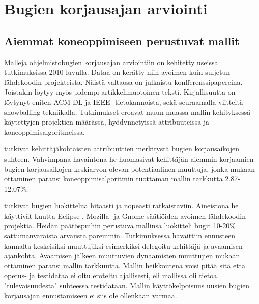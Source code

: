 \documentclass[utf8]{gradu3}
\begin{document}
\section{Bugien korjausajan arviointi}


\subsection{Aiemmat koneoppimiseen perustuvat mallit}
Malleja ohjelmistobugien korjausajan arviointiin on kehitetty useissa
tutkimuksissa 2010-luvulla. Dataa on kerätty niin avoimen kuin suljetun
lähdekoodin projekteista. Näistä valtaosa on julkaistu konfferenssipapereina.
Joistakin löytyy myös pidempi artikkelimuotoinen teksti. Kirjallisuutta on
löytynyt eniten ACM DL ja IEEE -tietokannoista, sekä seuraamalla viitteitä
snowballing-tekniikalla. Tutkimukset eroavat muun muassa mallin kehityksessä
käytettyjen projektien määrässä, hyödynnetyissä attribuuteissa ja
koneoppimisalgoritmeissa.

\textcite{Anh-2011} tutkivat kehittäjäkohtaisten attribuuttien merkitystä bugien
korjausaikojen suhteen. Vahvimpana havaintona he huomasivat kehittäjän aiemmin
korjaamien bugien korjausaikojen keskiarvon olevan potentiaalinen muuttuja,
jonka mukaan ottaminen paransi koneoppimisalgoritmin tuottaman mallin tarkkutta
2.87-12.07\%.

\textcite{Giger-2010} tutkivat bugien luokittelua hitaasti ja nopeasti
ratkaistaviin. Aineistona he käyttivät kuutta Eclipse-, Mozilla- ja
Gnome-säätiöiden avoimen lähdekoodin projektia. Heidän päätöspuihin perustuva
mallinsa luokitteli bugit 10-20\% sattumanvaraista arvausta paremmin.
Tutkimuksessa havaittiin ennusteen kannalta keskeisiksi muuttujiksi esimerkiksi
delegoitu kehittäjä ja avaamisen ajankohta. Avaamisen jälkeen muuttuvien
dynaamisten muuttujien mukaan ottaminen paransi mallin tarkkuutta. Mallin
heikkoutena voisi pitää sitä että opetus- ja testidataa ei oltu eroteltu
ajallisesti, eli mallissa oli tietoa "tulevaisuudesta" suhteessa testidataan.
Mallin käyttökelpoisuus uusien bugien korjausajan ennustamiseen ei siis ole
ollenkaan varmaa.
\end{document}
